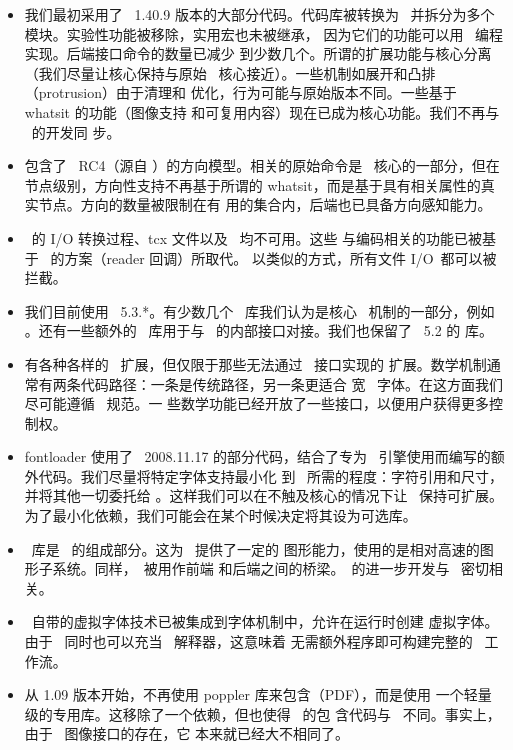 \begin{itemize}
    \item 我们最初采用了 \PDFTEX\ 1.40.9 版本的大部分代码。代码库被转换为
        \CCODE\ 并拆分为多个模块。实验性功能被移除，实用宏也未被继承，
        因为它们的功能可以用 \LUA\ 编程实现。后端接口命令的数量已减少
        到少数几个。所谓的扩展功能与核心分离（我们尽量让核心保持与原始
        \TEX\ 核心接近）。一些机制如展开和凸排（protrusion）由于清理和
        优化，行为可能与原始版本不同。一些基于 whatsit 的功能（图像支持
        和可复用内容）现在已成为核心功能。我们不再与 \PDFTEX\ 的开发同
        步。
    
    \item 包含了 \ALEPH\ RC4（源自 \OMEGA{}）的方向模型。相关的原始命令是
        \LUATEX\ 核心的一部分，但在节点级别，方向性支持不再基于所谓的
        whatsit，而是基于具有相关属性的真实节点。方向的数量被限制在有
        用的集合内，后端也已具备方向感知能力。
    
    \item \ALEPH\ 的 I/O 转换过程、tcx 文件以及 \ENCTEX\ 均不可用。这些
        与编码相关的功能已被基于 \LUA\ 的方案（reader 回调）所取代。
        以类似的方式，所有文件 I/O\ 都可以被拦截。
    
    \item 我们目前使用 \LUA\ 5.3.*。有少数几个 \LUA\ 库我们认为是核心
        \LUA\ 机制的一部分，例如 。还有一些额外的 \LUA\
        库用于与 \TEX\ 的内部接口对接。我们也保留了 \LUA\ 5.2 的
         库。
    
    \item 有各种各样的 \TEX\ 扩展，但仅限于那些无法通过 \LUA\ 接口实现的
        扩展。数学机制通常有两条代码路径：一条是传统路径，另一条更适合
        宽 \OPENTYPE\ 字体。在这方面我们尽可能遵循 \MICROSOFT\ 规范。一
        些数学功能已经开放了一些接口，以便用户获得更多控制权。
    
    \item fontloader 使用了 \FONTFORGE\ 2008.11.17 的部分代码，结合了专为
        \TEX\ 引擎使用而编写的额外代码。我们尽量将特定字体支持最小化
        到 \TEX\ 所需的程度：字符引用和尺寸，并将其他一切委托给
        \LUA{}。这样我们可以在不触及核心的情况下让 \TEX\ 保持可扩展。
        为了最小化依赖，我们可能会在某个时候决定将其设为可选库。
    
    \item \METAPOST\ 库是 \LUATEX\ 的组成部分。这为 \TEX\ 提供了一定的
        图形能力，使用的是相对高速的图形子系统。同样，\LUA\ 被用作前端
        和后端之间的桥梁。\METAPOST\ 的进一步开发与 \LUATEX\ 密切相关。
    
    \item \TEX\ 自带的虚拟字体技术已被集成到字体机制中，允许在运行时创建
        虚拟字体。由于 \LUATEX\ 同时也可以充当 \LUA\ 解释器，这意味着
        无需额外程序即可构建完整的 \TEX\ 工作流。
    
    \item 从 1.09 版本开始，不再使用 poppler 库来包含（PDF），而是使用
        一个轻量级的专用库。这移除了一个依赖，但也使得 \LUATEX\ 的包
        含代码与 \PDFTEX\ 不同。事实上，由于 \LUA\ 图像接口的存在，它
        本来就已经大不相同了。
    
\end{itemize}

